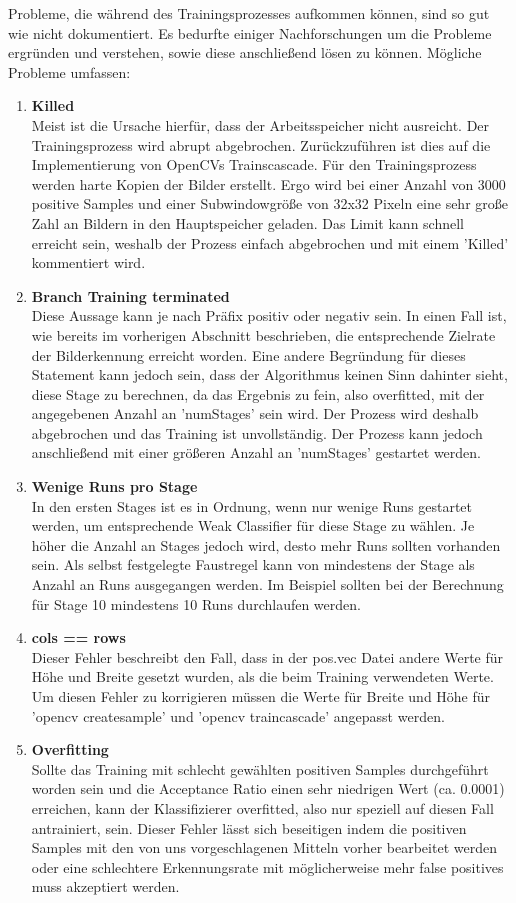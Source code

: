 Probleme, die während des Trainingsprozesses aufkommen können, sind so gut wie nicht dokumentiert. Es bedurfte einiger Nachforschungen um die Probleme ergründen und verstehen, sowie diese anschließend lösen zu können.
Mögliche Probleme umfassen:
\begin{enumerate}
\item \textbf{Killed}\\ Meist ist die Ursache hierfür, dass der Arbeitsspeicher nicht ausreicht. Der Trainingsprozess wird abrupt abgebrochen. Zurückzuführen ist dies auf die Implementierung von OpenCVs Trainscascade. Für den Trainingsprozess werden harte Kopien der Bilder erstellt. Ergo wird bei einer Anzahl von 3000 positive Samples und einer Subwindowgröße von 32x32 Pixeln eine sehr große Zahl an Bildern in den Hauptspeicher geladen. Das Limit kann schnell erreicht sein, weshalb der Prozess einfach abgebrochen und mit einem 'Killed' kommentiert wird.
\item \textbf{Branch Training terminated}\\ Diese Aussage kann je nach Präfix positiv oder negativ sein. In einen Fall ist, wie bereits im vorherigen Abschnitt beschrieben, die entsprechende Zielrate der Bilderkennung erreicht worden. Eine andere Begründung für dieses Statement kann jedoch sein, dass der Algorithmus keinen Sinn dahinter sieht, diese Stage zu berechnen, da das Ergebnis zu fein, also overfitted, mit der angegebenen Anzahl an 'numStages' sein wird. Der Prozess wird deshalb abgebrochen und das Training ist unvollständig. Der Prozess kann jedoch anschließend mit einer größeren Anzahl an 'numStages' gestartet werden.
\item \textbf{Wenige Runs pro Stage}\\ In den ersten Stages ist es in Ordnung, wenn nur wenige Runs gestartet werden, um entsprechende Weak Classifier für diese Stage zu wählen. Je höher die Anzahl an Stages jedoch wird, desto mehr Runs sollten vorhanden sein. Als selbst festgelegte Faustregel kann von mindestens der Stage als Anzahl an Runs ausgegangen werden. Im Beispiel sollten bei der Berechnung für Stage 10 mindestens 10 Runs durchlaufen werden.
\item \textbf{cols == rows}\\ Dieser Fehler beschreibt den Fall, dass in der pos.vec Datei andere Werte für Höhe und Breite gesetzt wurden, als die beim Training verwendeten Werte. Um diesen Fehler zu korrigieren müssen die Werte für Breite und Höhe für 'opencv createsample' und 'opencv traincascade' angepasst werden.
\item \textbf{Overfitting}\\ Sollte das Training mit schlecht gewählten positiven Samples durchgeführt worden sein und die Acceptance Ratio einen sehr niedrigen Wert (ca. 0.0001) erreichen, kann der Klassifizierer overfitted, also nur speziell auf diesen Fall antrainiert, sein. Dieser Fehler lässt sich beseitigen indem die positiven Samples mit den von uns vorgeschlagenen Mitteln vorher bearbeitet werden oder eine schlechtere Erkennungsrate mit möglicherweise mehr false positives muss akzeptiert werden.

\end{enumerate}
